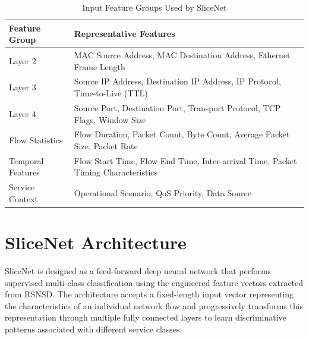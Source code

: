 \documentclass[12pt,a4paper]{report}
\begin{document}
	\begin{table}[H]
		\centering
		\caption{Input Feature Groups Used by SliceNet}
		\label{tab:input_features}
		
		\begin{tabular}{|p{5cm}|p{9cm}|}
			\hline
			
			\textbf{Feature Group} &
			\textbf{Representative Features}
			\\
			\hline
			
			Layer 2 &
			MAC Source Address, MAC Destination Address, Ethernet Frame Length
			\\
			\hline
			
			Layer 3 &
			Source IP Address, Destination IP Address, IP Protocol, Time-to-Live (TTL)
			\\
			\hline
			
			Layer 4 &
			Source Port, Destination Port, Transport Protocol, TCP Flags, Window Size
			\\
			\hline
			
			Flow Statistics &
			Flow Duration, Packet Count, Byte Count, Average Packet Size, Packet Rate
			\\
			\hline
			
			Temporal Features &
			Flow Start Time, Flow End Time, Inter-arrival Time, Packet Timing Characteristics
			\\
			\hline
			
			Service Context &
			Operational Scenario, QoS Priority, Data Source
			\\
			\hline
			
		\end{tabular}
		
	\end{table}
	
	\section{SliceNet Architecture}
	\label{sec:architecture}
	
	SliceNet is designed as a feed-forward deep neural network that performs supervised multi-class classification using the engineered feature vectors extracted from RSNSD. The architecture accepts a fixed-length input vector representing the characteristics of an individual network flow and progressively transforms this representation through multiple fully connected layers to learn discriminative patterns associated with different service classes.
	
\end{document}
